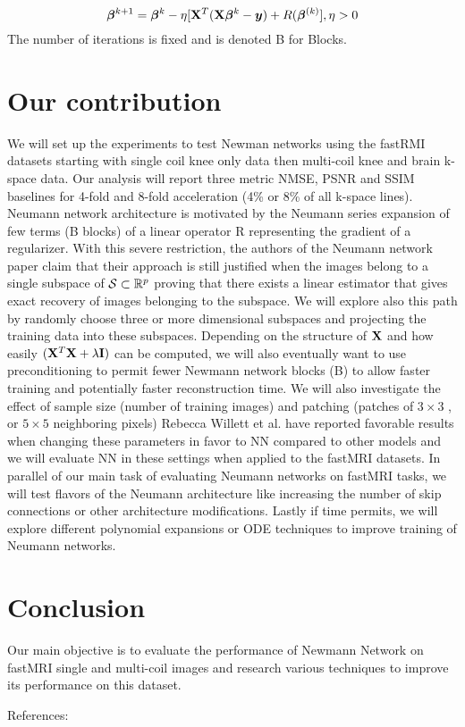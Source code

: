 \documentclass[12pt,twoside]{article}
\begin{document}
  $$ \bm{\beta}^{k+1} =  \bm{\beta}^{k} -\eta [{\mathbf X}^T ({\mathbf X} \bm{\beta}^{k} - \bm{y}) + R(\bm{\beta}^{(k)}], \eta > 0$$
  The number of iterations is fixed and is denoted B for Blocks.
  
\section{Our contribution}
We will set up the experiments to test Newman networks using the fastRMI datasets starting with single coil knee only data then multi-coil knee and brain k-space data.
Our analysis will report three metric NMSE, PSNR and SSIM baselines for 4-fold and 8-fold acceleration (4\% or 8\% of all k-space lines).
Neumann network architecture is motivated by the Neumann series expansion of few terms (B blocks) of a linear operator R representing the gradient of a regularizer.
With this severe restriction, the authors of the Neumann network paper claim that their approach is still justified when the images belong to a single subspace of $\mathcal{S} \subset \mathbb{R}^p$
proving that there exists a linear estimator that gives exact recovery of images belonging to the subspace. We will explore also this path by randomly choose three or more dimensional subspaces and
projecting the training data into these subspaces. Depending on the structure of ${\mathbf X}$ and how easily $({\mathbf X}^T {\mathbf X} + \lambda {\mathbf I})$ can be computed, 
we will also eventually want to use preconditioning to permit fewer Newmann network blocks (B)
to allow faster training and potentially faster reconstruction time. We will also investigate the effect of sample size (number of training images) and patching (patches of $3 \times 3$ , or $5 \times 5$ neighboring pixels)
\cite{DBLP:journals/corr/abs-1901-03707} Rebecca Willett et al. have reported favorable results when changing these parameters in favor to NN compared to other models and we will evaluate NN in these settings when applied to the fastMRI datasets.
In parallel of our main task of evaluating Neumann networks on fastMRI tasks,  we will test flavors of the Neumann architecture like increasing the number of skip connections or other architecture modifications. 
Lastly if time permits, we will explore different polynomial expansions or ODE techniques to improve training of Neumann networks.

\section{Conclusion}
Our main objective is to evaluate the performance of Newmann Network on fastMRI single and multi-coil images and research various techniques to improve its performance on this dataset.

References: \cite{DBLP:journals/corr/abs-1811-08839} \cite{DBLP:journals/corr/KamilovM15} \cite{DBLP:journals/corr/RomanoEM16} \cite{DBLP:journals/corr/abs-1712-02862}

 

\end{document}
